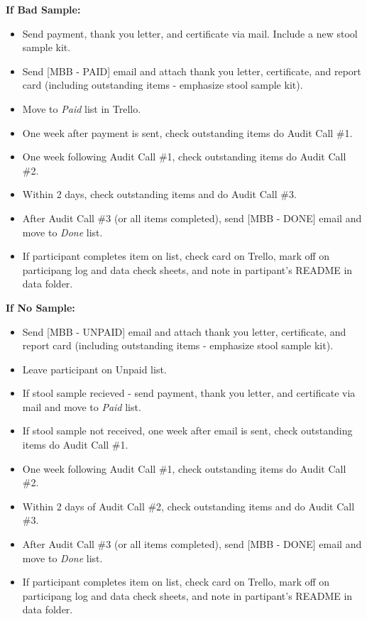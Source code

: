 \documentclass[]{book}
\providecommand{\tightlist}{%
  \setlength{\itemsep}{0pt}\setlength{\parskip}{0pt}}
\begin{document}
\textbf{If Bad Sample:}

\begin{itemize}
\tightlist
\item
  Send payment, thank you letter, and certificate via mail. Include a new stool sample kit.
\item
  Send {[}MBB - PAID{]} email and attach thank you letter, certificate, and report card (including outstanding items - emphasize stool sample kit).
\item
  Move to \emph{Paid} list in Trello.
\item
  One week after payment is sent, check outstanding items do Audit Call \#1.
\item
  One week following Audit Call \#1, check outstanding items do Audit Call \#2.
\item
  Within 2 days, check outstanding items and do Audit Call \#3.
\item
  After Audit Call \#3 (or all items completed), send {[}MBB - DONE{]} email and move to \emph{Done} list.
\item
  If participant completes item on list, check card on Trello, mark off on participang log and data check sheets, and note in partipant's README in data folder.
\end{itemize}

\textbf{If No Sample:}

\begin{itemize}
\tightlist
\item
  Send {[}MBB - UNPAID{]} email and attach thank you letter, certificate, and report card (including outstanding items - emphasize stool sample kit).
\item
  Leave participant on Unpaid list.
\item
  If stool sample recieved - send payment, thank you letter, and certificate via mail and move to \emph{Paid} list.
\item
  If stool sample not received, one week after email is sent, check outstanding items do Audit Call \#1.
\item
  One week following Audit Call \#1, check outstanding items do Audit Call \#2.
\item
  Within 2 days of Audit Call \#2, check outstanding items and do Audit Call \#3.
\item
  After Audit Call \#3 (or all items completed), send {[}MBB - DONE{]} email and move to \emph{Done} list.
\item
  If participant completes item on list, check card on Trello, mark off on participang log and data check sheets, and note in partipant's README in data folder.
\end{itemize}
\end{document}
